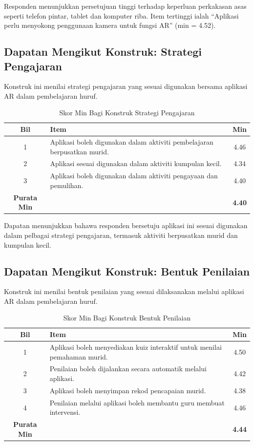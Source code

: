 {Responden menunjukkan persetujuan tinggi terhadap keperluan perkakasan asas seperti telefon pintar, tablet dan komputer riba. Item tertinggi ialah “Aplikasi perlu menyokong penggunaan kamera untuk fungsi AR” (min = 4.52).
\subsection{Dapatan Mengikut Konstruk: Strategi Pengajaran}

Konstruk ini menilai strategi pengajaran yang sesuai digunakan bersama aplikasi AR dalam pembelajaran huruf.

\begin{table}[H]
\centering
\caption{Skor Min Bagi Konstruk Strategi Pengajaran}
\label{jadual:strategiPengajaran}
\begin{tabular}{|c|p{9cm}|c|}
\hline
\textbf{Bil} & \textbf{Item} & \textbf{Min} \\
\hline
1 & Aplikasi boleh digunakan dalam aktiviti pembelajaran berpusatkan murid. & 4.46 \\
\hline
2 & Aplikasi sesuai digunakan dalam aktiviti kumpulan kecil. & 4.34 \\
\hline
3 & Aplikasi boleh digunakan dalam aktiviti pengayaan dan pemulihan. & 4.40 \\
\hline
\textbf{Purata Min} & & \textbf{4.40} \\
\hline
\end{tabular}
\end{table}

Dapatan menunjukkan bahawa responden bersetuju aplikasi ini sesuai digunakan dalam pelbagai strategi pengajaran, termasuk aktiviti berpusatkan murid dan kumpulan kecil.
\subsection{Dapatan Mengikut Konstruk: Bentuk Penilaian}

Konstruk ini menilai bentuk penilaian yang sesuai dilaksanakan melalui aplikasi AR dalam pembelajaran huruf.

\begin{table}[H]
\centering
\caption{Skor Min Bagi Konstruk Bentuk Penilaian}
\label{jadual:bentukPenilaian}
\begin{tabular}{|c|p{9cm}|c|}
\hline
\textbf{Bil} & \textbf{Item} & \textbf{Min} \\
\hline
1 & Aplikasi boleh menyediakan kuiz interaktif untuk menilai pemahaman murid. & 4.50 \\
\hline
2 & Penilaian boleh dijalankan secara automatik melalui aplikasi. & 4.42 \\
\hline
3 & Aplikasi boleh menyimpan rekod pencapaian murid. & 4.38 \\
\hline
4 & Penilaian melalui aplikasi boleh membantu guru membuat intervensi. & 4.46 \\
\hline
\textbf{Purata Min} & & \textbf{4.44} \\
\hline
\end{tabular}
\end{table}

}
